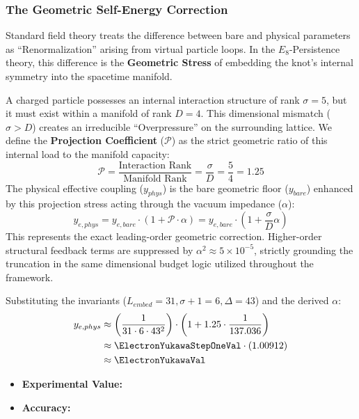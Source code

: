 \subsubsection{The Geometric Self-Energy Correction}
Standard field theory treats the difference between bare and physical parameters as ``Renormalization'' arising from virtual particle loops. In the $E_8$-Persistence theory, this difference is the \textbf{Geometric Stress} of embedding the knot's internal symmetry into the spacetime manifold.

A charged particle possesses an internal interaction structure of rank $\sigma=5$, but it must exist within a manifold of rank $D=4$. This dimensional mismatch ($\sigma > D$) creates an irreducible ``Overpressure'' on the surrounding lattice. We define the \textbf{Projection Coefficient} ($\mathcal{P}$) as the strict geometric ratio of this internal load to the manifold capacity:
\begin{equation}
\mathcal{P} = \frac{\text{Interaction Rank}}{\text{Manifold Rank}} = \frac{\sigma}{D} = \frac{5}{4} = 1.25
\end{equation}
The physical effective coupling ($y_{phys}$) is the bare geometric floor ($y_{bare}$) enhanced by this projection stress acting through the vacuum impedance ($\alpha$):
\begin{equation}
y_{e,phys} = y_{e,bare} \cdot \left(1 + \mathcal{P} \cdot \alpha \right) = y_{e,bare} \cdot \left(1 + \frac{\sigma}{D}\alpha \right)
\end{equation}
This represents the exact leading-order geometric correction. Higher-order structural feedback terms are suppressed by $\alpha^2 \approx 5 \times 10^{-5}$, strictly grounding the truncation in the same dimensional budget logic utilized throughout the framework.

Substituting the invariants ($L_{embed}=31, \sigma+1=6, \Delta=43$) and the derived $\alpha$:
\begin{equation}
\begin{split}
y_{e,phys} &\approx \left(\frac{1}{31 \cdot 6 \cdot 43^2}\right) \cdot \left(1 + 1.25 \cdot \frac{1}{137.036}\right) \\
&\approx \ElectronYukawaStepOneVal \cdot (1.00912) \\
&\approx \mathbf{\ElectronYukawaVal}
\end{split}
\end{equation}

\begin{itemize}
    \item \textbf{Experimental Value:} \ElectronYukawaExperimentalValue
    \item \textbf{Accuracy:} \ElectronYukawaAccText
\end{itemize}

